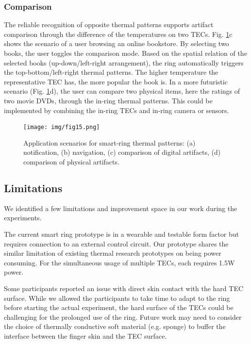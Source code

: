 \documentclass[preprint,12pt]{elsarticle}
\begin{document}
\subsubsection{Comparison}
The reliable recognition of opposite thermal patterns supports artifact comparison through the difference of the temperatures on two TECs. Fig. \ref{fig:15}c shows the scenario of a user browsing an online bookstore. By selecting two books, the user toggles the comparison mode. Based on the spatial relation of the selected books (up-down/left-right arrangement), the ring automatically triggers the top-bottom/left-right thermal patterns. The higher temperature the representative TEC has, the more popular the book is. In a more futuristic scenario (Fig. \ref{fig:15}d), the user can compare two physical items, here the ratings of two movie DVDs, through the in-ring thermal patterns. This could be implemented by combining the in-ring TECs and in-ring camera or sensors.

\begin{figure}[tp]
  \centering
  \texttt{[image: img/fig15.png]}
  \caption{Application scenarios for smart-ring thermal patterns: (a) notification, (b) navigation, (c) comparison of digital artifacts, (d) comparison of physical artifacts.}
  \label{fig:15}
\end{figure}

\subsection{Limitations}
We identified a few limitations and improvement space in our work during the experiments.

The current smart ring prototype is in a wearable and testable form factor but requires connection to an external control circuit. Our prototype shares the similar limitation of existing thermal research prototypes on being power consuming. For the simultaneous usage of multiple TECs, each requires 1.5W power.

Some participants reported an issue with direct skin contact with the hard TEC surface. While we allowed the participants to take time to adapt to the ring before starting the actual experiment, the hard surface of the TECs could be challenging for the prolonged use of the ring. Future work may need to consider the choice of thermally conductive soft material (e.g. sponge) to buffer the interface between the finger skin and the TEC surface.
\end{document}
